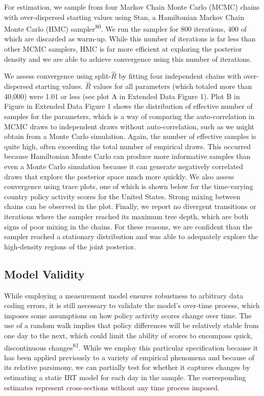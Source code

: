 \documentclass[]{article}
\begin{document}
For estimation, we sample from four Markov Chain Monte Carlo (MCMC) chains with over-dispersed starting values using Stan, a Hamiltonian Markov Chain Monte Carlo (HMC) sampler\textsuperscript{80}. We run the sampler for 800 iterations, 400 of which are discarded as warm-up. While this number of iterations is far less than other MCMC samplers, HMC is far more efficient at exploring the posterior density and we are able to achieve convergence using this number of iterations.

We assess convergence using split-\(\hat{R}\) by fitting four independent chains with over-dispersed starting values. \(\hat{R}\) values for all parameters (which totaled more than 40,000) were 1.01 or less (see plot A in Extended Data Figure 1). Plot B in Figure in Extended Data Figure 1 shows the distribution of effective number of samples for the parameters, which is a way of comparing the auto-correlation in MCMC draws to independent draws without auto-correlation, such as we might obtain from a Monte Carlo simulation. Again, the number of effective samples is quite high, often exceeding the total number of empirical draws. This occurred because Hamiltonian Monte Carlo can produce more informative samples than even a Monte Carlo simulation because it can generate negatively correlated draws that explore the posterior space much more quickly. We also assess convergence using trace plots, one of which is shown below for the time-varying country policy activity scores for the United States. Strong mixing between chains can be observed in the plot. Finally, we report no divergent transitions or iterations where the sampler reached its maximum tree depth, which are both signs of poor mixing in the chains. For these reasons, we are confident than the sampler reached a stationary distribution and was able to adequately explore the high-density regions of the joint posterior.

\hypertarget{model-validity}{%
\subsection*{Model Validity}\label{model-validity}}

While employing a measurement model ensures robustness to arbitrary data coding errors, it is still necessary to validate the model's over-time process, which imposes some assumptions on how policy activity scores change over time. The use of a random walk implies that policy differences will be relatively stable from one day to the next, which could limit the ability of scores to encompass quick, discontinuous changes\textsuperscript{81}. While we employ this particular specification because it has been applied previously to a variety of empirical phenomena and because of its relative parsimony, we can partially test for whether it captures changes by estimating a static IRT model for each day in the sample. The corresponding estimates represent cross-sections without any time process imposed.
\end{document}
